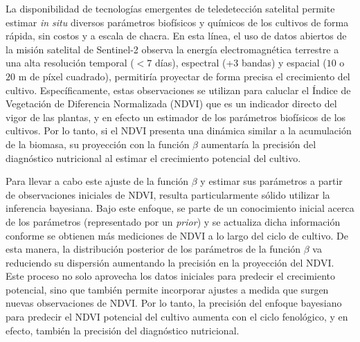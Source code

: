 \documentclass[
11pt, %
]{charter}
\begin{document}
La disponibilidad de tecnologías emergentes de teledetección satelital permite estimar \emph{in situ} diversos parámetros biofísicos y químicos de los cultivos de forma rápida, sin costos y a escala de chacra. En esta línea, el uso de datos abiertos de la misión satelital de Sentinel-2 observa la energía electromagnética terrestre a una alta resolución temporal ($\mathbb{<}7$ días), espectral (+3 bandas) y espacial ($10$ o $20$ m de píxel cuadrado), permitiría proyectar de forma precisa el crecimiento del cultivo. Específicamente, estas observaciones se utilizan para caluclar el Índice de Vegetación de Diferencia Normalizada (NDVI) que es un indicador directo del vigor de las plantas, y en efecto un estimador de los parámetros biofísicos de los cultivos. Por lo tanto, si el NDVI presenta una dinámica similar a la acumulación de la biomasa, su proyección con la función $\beta$ aumentaría la precisión del diagnóstico nutricional al estimar el crecimiento potencial del cultivo.

Para llevar a cabo este ajuste de la función $\beta$ y estimar sus parámetros a partir de observaciones iniciales de NDVI, resulta particularmente sólido utilizar la inferencia bayesiana. Bajo este enfoque, se parte de un conocimiento inicial acerca de los parámetros (representado por un \emph{prior}) y se actualiza dicha información conforme se obtienen más mediciones de NDVI a lo largo del ciclo de cultivo. De esta manera, la distribución posterior de los parámetros de la función $\beta$ va reduciendo su dispersión aumentando la precisión en la proyección del NDVI. Este proceso no solo aprovecha los datos iniciales para predecir el crecimiento potencial, sino que también permite incorporar ajustes a medida que surgen nuevas observaciones de NDVI. Por lo tanto, la precisión del enfoque bayesiano para predecir el NDVI potencial del cultivo aumenta con el ciclo fenológico, y en efecto, también la precisión del diagnóstico nutricional.
\end{document}
